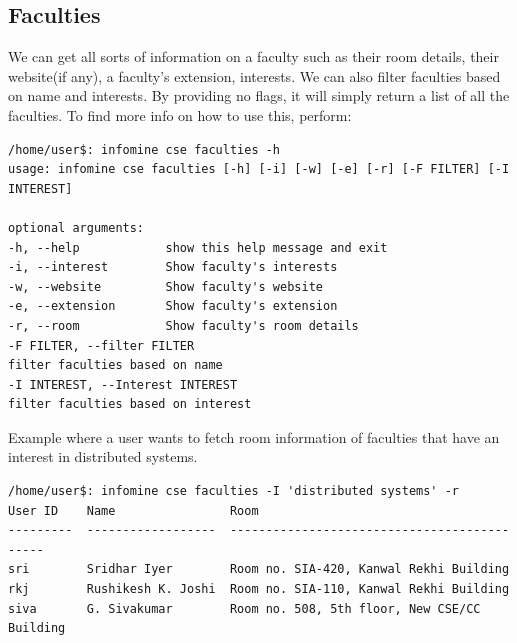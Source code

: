 \documentclass[12pt, a4paper]{article}
\begin{document}
\subsection{Faculties}
We can get all sorts of information on a faculty such as their room details, their website(if any),
a faculty's extension, interests. We can also filter faculties based on name
and interests. By providing no flags, it will simply return a list of all the faculties.
To find more info on how to use this, perform:
\begin{verbatim}
/home/user$: infomine cse faculties -h
usage: infomine cse faculties [-h] [-i] [-w] [-e] [-r] [-F FILTER] [-I INTEREST]

optional arguments:
-h, --help            show this help message and exit
-i, --interest        Show faculty's interests
-w, --website         Show faculty's website
-e, --extension       Show faculty's extension
-r, --room            Show faculty's room details
-F FILTER, --filter FILTER
filter faculties based on name
-I INTEREST, --Interest INTEREST
filter faculties based on interest
\end{verbatim}
Example where a user wants to fetch room information of faculties that 
have an interest in distributed systems. 
\begin{verbatim}
/home/user$: infomine cse faculties -I 'distributed systems' -r
User ID    Name                Room                                          
---------  ------------------  --------------------------------------------  
sri        Sridhar Iyer        Room no. SIA-420, Kanwal Rekhi Building       
rkj        Rushikesh K. Joshi  Room no. SIA-110, Kanwal Rekhi Building 
siva       G. Sivakumar        Room no. 508, 5th floor, New CSE/CC Building 
\end{verbatim}
\end{document}
